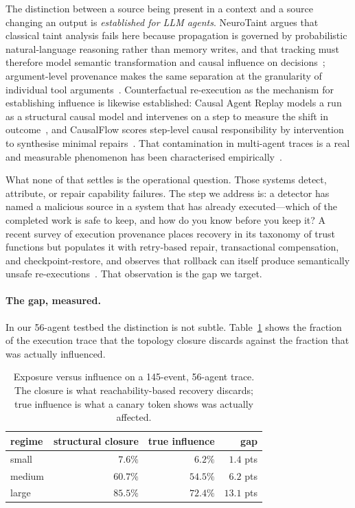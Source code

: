 \documentclass[10pt,twocolumn]{article}
\begin{document}
The distinction between a source being present in a context and a source
changing an output is \emph{established for LLM agents}. NeuroTaint argues
that classical taint analysis fails here because propagation is governed by
probabilistic natural-language reasoning rather than memory writes, and that
tracking must therefore model semantic transformation and causal influence on
decisions~\cite{neurotaint2026}; argument-level provenance makes the same
separation at the granularity of individual tool
arguments~\cite{granularity2026}. Counterfactual re-execution as the mechanism
for establishing influence is likewise established: Causal Agent Replay models
a run as a structural causal model and intervenes on a step to measure the
shift in outcome~\cite{car2026}, and CausalFlow scores step-level causal
responsibility by intervention to synthesise minimal
repairs~\cite{causalflow2026}. That contamination in multi-agent traces is a
real and measurable phenomenon has been characterised
empirically~\cite{tracelevel2026}.

What none of that settles is the operational question. Those systems detect,
attribute, or repair capability failures. The step we address is: a detector
has named a malicious source in a system that has already executed---which
of the completed work is safe to keep, and how do you know before you keep it?
A recent survey of execution provenance places recovery in its taxonomy of
trust functions but populates it with retry-based repair, transactional
compensation, and checkpoint-restore, and observes that rollback can itself
produce semantically unsafe re-executions~\cite{trustsurvey2026}. That
observation is the gap we target.

\paragraph{The gap, measured.}
In our 56-agent testbed the distinction is not subtle. Table~\ref{tab:gap}
shows the fraction of the execution trace that the topology closure discards
against the fraction that was actually influenced.

\begin{table}[t]
\centering
\small
\begin{tabular}{lrrr}
\toprule
regime & structural closure & true influence & gap \\
\midrule
small  & $7.6\%$  & $6.2\%$  & $1.4$ pts \\
medium & $60.7\%$ & $54.5\%$ & $6.2$ pts \\
large  & $85.5\%$ & $72.4\%$ & $13.1$ pts \\
\bottomrule
\end{tabular}
\caption{Exposure versus influence on a 145-event, 56-agent trace. The
closure is what reachability-based recovery discards; true influence is what
a canary token shows was actually affected.}
\label{tab:gap}
\end{table}
\end{document}
